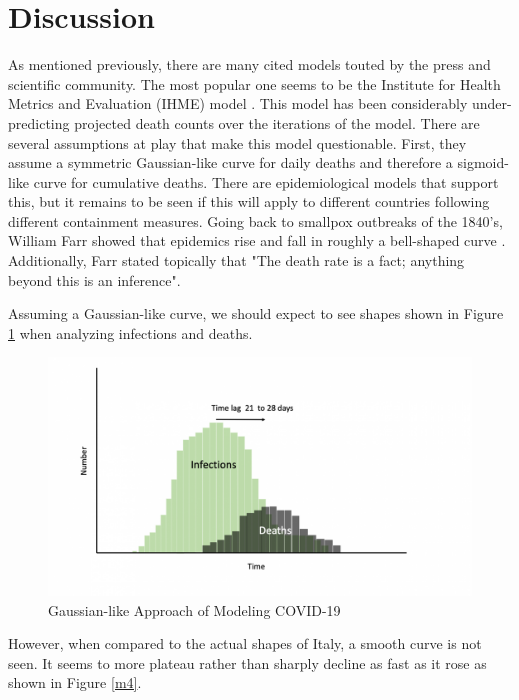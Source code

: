 \section{Discussion}
\graphicspath{{Figures/}{../Figures/}}
\label{Discussion}
 As mentioned previously, there are many cited models touted by the press and scientific community.  The most popular one seems to be the Institute for Health Metrics and Evaluation (IHME) model \cite{imhe}.  This model has been considerably under-predicting projected death counts over the iterations of the model.  There are several assumptions at play that make this model questionable.  First, they assume a symmetric Gaussian-like curve for daily deaths and therefore a sigmoid-like curve for cumulative deaths.  There are epidemiological models that support this, but it remains to be seen if this will apply to different countries following different containment measures. Going back to smallpox outbreaks of the 1840's, William Farr showed that epidemics rise and fall in roughly a bell-shaped curve \cite{farr}.  Additionally, Farr stated topically that "The death rate is a fact; anything beyond this is an inference".  
 
 Assuming a Gaussian-like curve, we should expect to see shapes shown in Figure \ref{m3} when analyzing infections and deaths.

 \begin{figure}[H]
\centerline{\includegraphics[scale=0.18]{Figures/ss.png}}
\caption{Gaussian-like Approach of Modeling COVID-19}
\label{m3}
\end{figure}


However, when compared to the actual shapes of Italy, a smooth curve is not seen.  It seems to more plateau rather than sharply decline as fast as it rose as shown in Figure \ref{m4}.

